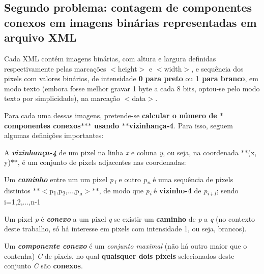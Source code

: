 \subsection*{Segundo problema\+: contagem de componentes conexos em imagens binárias representadas em arquivo X\+ML}

Cada X\+ML contém imagens binárias, com altura e largura definidas respectivamente pelas marcações {\ttfamily $<$height$>$} e {\ttfamily $<$width$>$}, e sequência dos pixels com valores binários, de intensidade {\bfseries{0 para preto}} ou {\bfseries{1 para branco}}, em modo texto (embora fosse melhor gravar 1 byte a cada 8 bits, optou-\/se pelo modo texto por simplicidade), na marcação {\ttfamily $<$data$>$}.

Para cada uma dessas imagens, pretende-\/se {\bfseries{calcular o número de $\ast$componentes conexos$\ast$$\ast$$\ast$ usando $\ast$$\ast$vizinhança-\/4}}. Para isso, seguem algumas definições importantes\+:
\begin{DoxyItemize}
\item A {\itshape {\bfseries{vizinhança-\/4}}} de um pixel na linha {\itshape x} e coluna {\itshape y}, ou seja, na coordenada $\ast$$\ast$(x, y)$\ast$$\ast$, é um conjunto de pixels adjacentes nas coordenadas\+: 
\begin{DoxyCode}{0}
\end{DoxyCode}

\item Um {\itshape {\bfseries{caminho}}} entre um um pixel {\itshape p\textsubscript{1}} e outro {\itshape p\textsubscript{n}} é uma sequência de pixels distintos $\ast$$\ast$$<$p\textsubscript{1},p\textsubscript{2},...,p\textsubscript{n}$>$$\ast$$\ast$, de modo que {\itshape p\textsubscript{i}} é {\bfseries{vizinho-\/4}} de {\itshape p\textsubscript{i+1}}; sendo i=1,2,...,n-\/1
\item Um pixel {\itshape p} é {\itshape {\bfseries{conexo}}} a um pixel {\itshape q} se existir um {\bfseries{caminho}} de {\itshape p} a {\itshape q} (no contexto deste trabalho, só há interesse em pixels com intensidade 1, ou seja, brancos).
\item Um {\itshape {\bfseries{componente conexo}}} é um {\itshape conjunto maximal} (não há outro maior que o contenha) {\itshape C} de pixels, no qual {\bfseries{quaisquer dois pixels}} selecionados deste conjunto {\itshape C} são {\bfseries{conexos}}.
\end{DoxyItemize}

